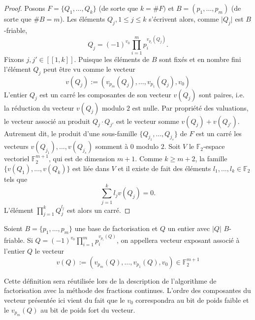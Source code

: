 \begin{proof}
	Posons $F = \{Q_1, \dots, Q_k\}$ (de sorte que $k = \# F)$ et $B = (p_1,
	\dots, p_m)$ (de sorte que $\# B = m$). Les éléments $Q_j, 1\leqslant j
    \leqslant k$ s'écrivent alors, comme $\lvert Q_j \rvert$ est $B$-friable,
    \[Q_j = (-1)^{v_0}\prod_{i=1}^m p_i^{v_{p_i}(Q_j)}.\]
	Fixons $j, j'\in [\![1, k]\!]$. Puisque les éléments de $B$ sont fixés et
	en nombre fini l'élément $Q_j$ peut être vu comme le vecteur
    \[v(Q_j) := (v_{p_m}(Q_j), \dots, v_{p_1}(Q_j), v_0 )\] L'entier $Q_j$ est
    un carré \ssi les composantes de son vecteur $v(Q_j)$ sont paires, i.e. la
	réduction du vecteur $v(Q_j)$ modulo $2$ est nulle. Par propriété des
	valuations, le vecteur associé au produit $Q_j\cdot Q_{j'}$ est le vecteur
	somme $v(Q_j) + v(Q_{j'})$. Autrement dit, le produit d'une sous-famille
	$\{Q_{j_1}, \dots, Q_{j_s}\}$ de $F$ est un carré \ssi les vecteurs
	$v(Q_{j_1}), \dots, v(Q_{j_s})$ somment à $0$ modulo $2$. Soit $V$ le
    $\mathbb{F}_2$-espace vectoriel $\mathbb{F}_2^{m+1}$, qui est de dimension
    $m+1$. Comme $k\geqslant m+2$, la famille $\{v(Q_1), \dots, v(Q_k)\}$ est 
    liée dans $V$ et il existe de fait des éléments $l_1,\dots, l_k\in 
    \mathbb{F}_2$ tels que \[\sum_{j=1}^k l_j v(Q_j) = 0.\] L'élément 
    $\prod_{j=1}^k Q_j^{l_j}$ est alors un carré.
\end{proof}

\begin{definition}
    Soient $B = \{p_1,\dots, p_m \}$ une base de factorisation et $Q$ un 
    entier avec $\lvert Q \rvert$  $B$-friable. Si $Q = (-1)^{v_0} 
    \prod_{i=1}^m p_i^{v_{p_i}(Q)}$, on appellera vecteur exposant associé
    à l'entier $Q$ le vecteur \[v(Q) := (v_{p_m}(Q), \dots, v_{p_1}(Q), v_0 )
    \in \mathbb{F}_2^{m+1} \] 
\end{definition}

\begin{remarque}
    Cette définition sera réutilisée lors de la description de l'algorithme
    de factorisation avec la méthode des fractions continues. L'ordre des
    composantes du vecteur présentée ici vient du fait que le $v_0$ correspondra
    au bit de poids faible et le $v_{p_m}(Q)$ au bit de poids fort du vecteur. \\ 
\end{remarque}

